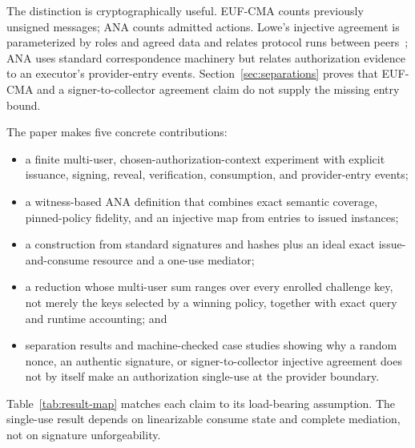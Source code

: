 \documentclass[10pt]{article}
\begin{document}
The distinction is cryptographically useful. EUF-CMA counts previously unsigned
messages; ANA counts admitted actions. Lowe's injective agreement is
parameterized by roles and agreed data and relates protocol runs between
peers~\cite{lowe97}; ANA uses standard correspondence machinery but relates
authorization evidence to an executor's provider-entry events.
Section~\ref{sec:separations} proves that EUF-CMA and a signer-to-collector
agreement claim do not supply the missing entry bound.

The paper makes five concrete contributions:

\begin{itemize}[leftmargin=*]
\item a finite multi-user, chosen-authorization-context experiment with explicit
issuance, signing, reveal, verification, consumption, and provider-entry events;
\item a witness-based ANA definition that combines exact semantic coverage,
pinned-policy fidelity, and an injective map from entries to issued instances;
\item a construction from standard signatures and hashes plus an ideal exact
issue-and-consume resource and a one-use mediator;
\item a reduction whose multi-user sum ranges over every enrolled challenge key,
not merely the keys selected by a winning policy, together with exact query and
runtime accounting; and
\item separation results and machine-checked case studies showing why a random
nonce, an authentic signature, or signer-to-collector injective agreement does
not by itself make an authorization single-use at the provider boundary.
\end{itemize}

Table~\ref{tab:result-map} matches each claim to its load-bearing assumption.
The single-use result depends on linearizable consume state and complete
mediation, not on signature unforgeability.
\end{document}
